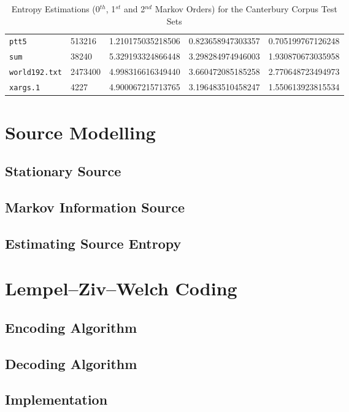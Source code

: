 \documentclass[a4paper, twocolumn]{article}
\begin{document}
\begin{table*}[t]
\begin{tabular}{lllll}
            \texttt{ptt5} & 513216 & 1.210175035218506 & 0.823658947303357 & 0.705199767126248 \\
            \texttt{sum} & 38240 & 5.329193324866448 & 3.298284974946003 & 1.930870673035958 \\
            \texttt{world192.txt} & 2473400 & 4.998316616349440 & 3.660472085185258 & 2.770648723494973 \\
            \texttt{xargs.1} & 4227 & 4.900067215713765 & 3.196483510458247 & 1.550613923815534 \\
        \bottomrule
        \end{tabular}
        \caption{Entropy Estimations (0$^{th}$, 1$^{st}$ and 2$^{nd}$ Markov Orders) for the Canterbury Corpus Test Sets}
        \label{tab:canterbury}
    \end{table*}

    \section{Source Modelling} \label{sec:source_modelling}
        \subsection{Stationary Source} \label{sec:stationary_source}
        \subsection{Markov Information Source} \label{sec:markov_information_source}
        \subsection{Estimating Source Entropy} \label{sec:estimating_source_entropy}

    \clearpage
    \section{Lempel--Ziv--Welch Coding} \label{sec:lempel_ziv_welch}
        \subsection{Encoding Algorithm} \label{sec:lzw_encoding_algorithm}
        \subsection{Decoding Algorithm} \label{sec:lzw_decoding_algorithm}
        \subsection{Implementation} \label{sec:lzw_implementation}
\end{document}
